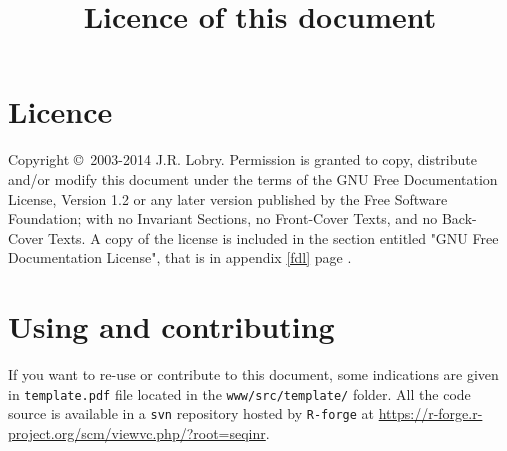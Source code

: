 \title{Licence of this document}
\section*{Licence}

    Copyright \copyright~2003-2014 J.R. Lobry.
    Permission is granted to copy, distribute and/or modify this document
    under the terms of the GNU Free Documentation License, Version 1.2
    or any later version published by the Free Software Foundation;
    with no Invariant Sections, no Front-Cover Texts, and no Back-Cover Texts.
    A copy of the license is included in the section entitled "GNU
    Free Documentation License", that is in appendix \ref{fdl} page \pageref{fdl}.

\section*{Using and contributing}

If you want to re-use or contribute to this document, some indications are
given in \texttt{template.pdf} file located in the \texttt{www/src/template/}
folder. All the code source
is available in a \texttt{svn} repository hosted by \texttt{R-forge} at
\url{https://r-forge.r-project.org/scm/viewvc.php/?root=seqinr}.

